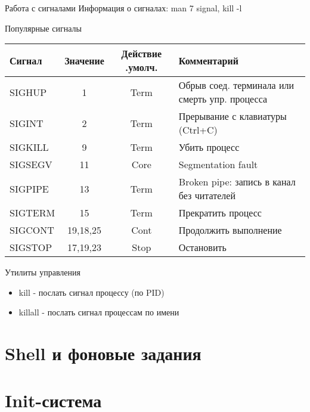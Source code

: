 \begin{frame}[fragile]{Работа с сигналами}
  \small Информация о сигналах: \alert{man 7 signal}, \alert{kill -l}
  \begin{block}{Популярные сигналы}
    \tiny
    \begin{tabular}{l|c|c|l}
      Сигнал & Значение & Действие
      .умолч.& Комментарий \\ \hline 
      SIGHUP &    1     &  Term   &  Обрыв соед. терминала или смерть упр. процесса \\
      SIGINT &    2     &  Term   & Прерывание с клавиатуры (Ctrl+C) \\
      SIGKILL &   9    &  Term   & Убить процесс \\
      SIGSEGV &   11    &  Core   & Segmentation fault \\
      SIGPIPE &   13    &  Term   & Broken pipe: запись в канал без читателей\\
      SIGTERM &   15    &  Term   & Прекратить процесс \\
      SIGCONT &  19,18,25 &  Cont & Продолжить выполнение \\
      SIGSTOP &  17,19,23 &  Stop & Остановить 
    \end{tabular}
  \end{block} \pause

  \begin{block}{Утилиты управления}
    \begin{itemize}
      \item \alert{kill} - послать сигнал процессу (по PID)
      \item \alert{killall} - послать сигнал процессам по имени
    \end{itemize}
  \end{block}

\end{frame}

\section{Shell и фоновые задания}

\section{Init-система}


